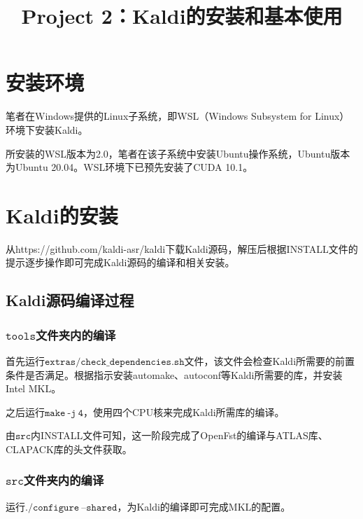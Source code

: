 \documentclass[a4paper]{article}
\title{Project 2：Kaldi的安装和基本使用}
\begin{document}
\maketitle

\setcounter{section}{-1}
\section{安装环境}
笔者在Windows提供的Linux子系统，即WSL（Windows Subsystem for Linux）环境下安装Kaldi。

所安装的WSL版本为2.0，笔者在该子系统中安装Ubuntu操作系统，Ubuntu版本为Ubuntu 20.04。WSL环境下已预先安装了CUDA 10.1。




\section{Kaldi的安装}
从https://github.com/kaldi-asr/kaldi下载Kaldi源码，解压后根据INSTALL文件的提示逐步操作即可完成Kaldi源码的编译和相关安装。

\subsection{Kaldi源码编译过程}
\subsubsection{$\mathtt{tools}$文件夹内的编译}

首先运行$\mathtt{extras/check\_dependencies.sh}$文件，该文件会检查Kaldi所需要的前置条件是否满足。根据指示安装automake、autoconf等Kaldi所需要的库，并安装Intel MKL。

之后运行$\mathtt{make\ \text{-}j\ 4}$，使用四个CPU核来完成Kaldi所需库的编译。

由$\mathtt{src}$内INSTALL文件可知，这一阶段完成了OpenFst的编译与ATLAS库、CLAPACK库的头文件获取。

\subsubsection{$\mathtt{src}$文件夹内的编译}

运行$\mathtt{./configure\ \text{--}shared}$，为Kaldi的编译即可完成MKL的配置。
\end{document}
